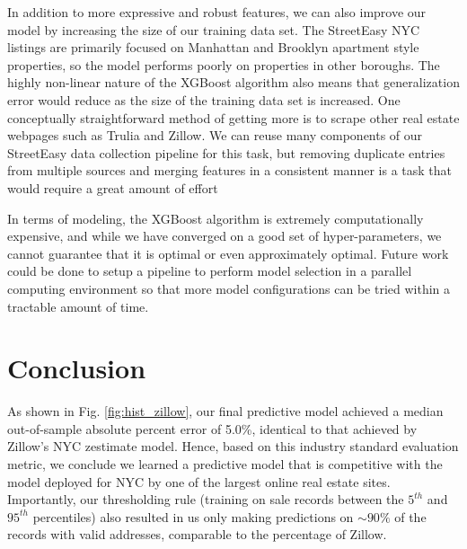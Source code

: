 \documentclass[journal]{IEEEtran}
\begin{document}
In addition to more expressive and robust features, we can also improve our model by increasing the size of our training data set. The StreetEasy NYC listings are primarily focused on Manhattan and Brooklyn apartment style properties, so the model performs poorly on properties in other boroughs. The highly non-linear nature of the XGBoost algorithm also means that generalization error would reduce as the size of the training data set is increased. One conceptually straightforward method of getting more is to scrape other real estate webpages such as Trulia and Zillow. We can reuse many components of our StreetEasy data collection pipeline for this task, but removing duplicate entries from multiple sources and merging features in a consistent manner is a task that would require a great amount of effort

In terms of modeling, the XGBoost algorithm is extremely computationally expensive, and while we have converged on a good set of hyper-parameters, we cannot guarantee that it is optimal or even approximately optimal. Future work could be done to setup a pipeline to perform model selection in a parallel computing environment so that more model configurations can be tried within a tractable amount of time.

\section{Conclusion}

As shown in Fig. \ref{fig:hist_zillow}, our final predictive model achieved a median out-of-sample absolute percent error of 5.0\%, identical to that achieved by Zillow's NYC zestimate model. Hence, based on this industry standard evaluation metric, we conclude we learned a predictive model that is competitive with the model deployed for NYC by one of the largest online real estate sites. Importantly, our thresholding rule (training on sale records between the $5^{th}$ and $95^{th}$ percentiles) also resulted in us only making predictions on $\sim 90\%$ of the records with valid addresses, comparable to the percentage of Zillow.



\end{document}
